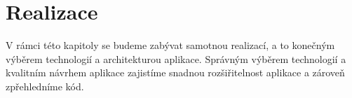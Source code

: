 \chapter{Realizace}
\label{ch:implementation}
V rámci této kapitoly se budeme zabývat samotnou realizací, a to konečným výběrem technologií a architekturou aplikace. Správným výběrem technologií a kvalitním návrhem aplikace zajistíme snadnou rozšiřitelnost aplikace a zároveň zpřehledníme kód.





